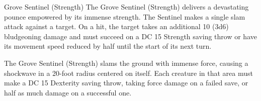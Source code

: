 \documentclass[letterpaper,openany,twoside,twocolumn]{book}
\begin{document}
\begin{DndMonster}[width=0.5\textwidth +0.5em]{Grove Sentinel (Strength)}
    The Grove Sentinel (Strength) delivers a devastating pounce empowered by its immense strength. The Sentinel makes a single slam attack against a target. On a hit, the target takes an additional 10 (3d6) bludgeoning damage and must succeed on a DC 15 Strength saving throw or have its movement speed reduced by half until the start of its next turn.
    
	The Grove Sentinel (Strength) slams the ground with immense force, causing a shockwave in a 20-foot radius centered on itself. Each creature in that area must make a DC 15 Dexterity saving throw, taking  force damage on a failed save, or half as much damage on a successful one.
      
\end{DndMonster}

%

\end{document}
